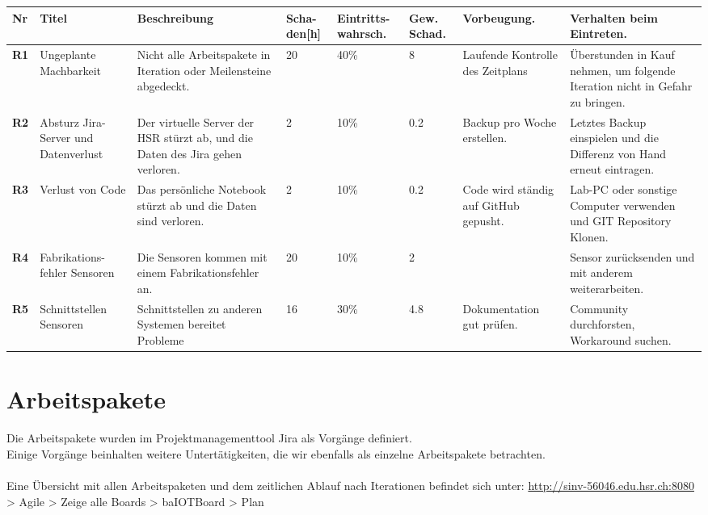 \begin{landscape}
	\begin{tabularx}{\linewidth}{lp{2cm}Xp{1cm}p{1.5cm}p{1.5cm}XX}
	\textbf{Nr}	& \textbf{Titel} & \textbf{Beschreibung} & \textbf{Scha-den[h]} & \textbf{Eintritts-wahrsch.} & \textbf{Gew. Schad.} & \textbf{Vorbeugung.} & \textbf{Verhalten beim Eintreten.}\\
	\hline
	\textbf{R1} & Ungeplante Machbarkeit	& Nicht alle Arbeitspakete in Iteration oder Meilensteine abgedeckt.	& 20 & 40\% & 8 & Laufende Kontrolle des Zeitplans & Überstunden in Kauf nehmen, um folgende Iteration nicht in Gefahr zu bringen. \\ \hline
	\textbf{R2} & Absturz Jira-Server und Datenverlust	& Der virtuelle Server der HSR stürzt ab, und die Daten des Jira gehen verloren. & 2 & 10\% & 0.2 & Backup pro Woche erstellen. & Letztes Backup einspielen und die Differenz von Hand erneut eintragen. \\ \hline
	\textbf{R3} & Verlust von Code & Das persönliche Notebook stürzt ab und die Daten sind verloren. & 2 & 10\% & 0.2 & Code wird ständig auf GitHub gepusht. & Lab-PC oder sonstige Computer verwenden und GIT Repository Klonen. \\ \hline
	\textbf{R4} & Fabrikations-fehler Sensoren & Die Sensoren kommen mit einem Fabrikationsfehler an. & 20 & 10\% & 2 & & Sensor zurücksenden und mit anderem weiterarbeiten. \\ \hline
	\textbf{R5} & Schnittstellen Sensoren & Schnittstellen zu anderen Systemen bereitet Probleme & 16 & 30\% & 4.8 & Dokumentation gut prüfen. & Community durchforsten, Workaround suchen. \\ \hline
\end{tabularx}
\end{landscape}

\section*{Arbeitspakete}
Die Arbeitspakete wurden im Projektmanagementtool Jira als Vorgänge definiert. \\
Einige Vorgänge beinhalten weitere Untertätigkeiten, die wir ebenfalls als einzelne Arbeitspakete betrachten. \\
\\
Eine Übersicht mit allen Arbeitspaketen und dem zeitlichen Ablauf nach Iterationen befindet sich unter: \url{http://sinv-56046.edu.hsr.ch:8080} > Agile > Zeige alle Boards > baIOTBoard > Plan

